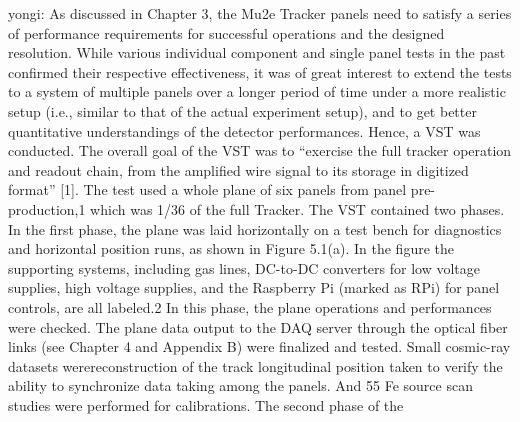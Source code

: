 yongi:
As discussed in Chapter 3, the Mu2e Tracker panels need to satisfy a series of performance
requirements for successful operations and the designed resolution. While various individual
component and single panel tests in the past confirmed their respective effectiveness, it was of great
interest to extend the tests to a system of multiple panels over a longer period of time under a more
realistic setup (i.e., similar to that of the actual experiment setup), and to get better quantitative
understandings of the detector performances. Hence, a VST was conducted.
The overall goal of the VST was to “exercise the full tracker operation and readout chain,
from the amplified wire signal to its storage in digitized format” [1]. The test used a whole plane of
six panels from panel pre-production,1 which was 1/36 of the full Tracker.
The VST contained two phases. In the first phase, the plane was laid horizontally on a
test bench for diagnostics and horizontal position runs, as shown in Figure 5.1(a). In the figure
the supporting systems, including gas lines, DC-to-DC converters for low voltage supplies, high
voltage supplies, and the Raspberry Pi (marked as RPi) for panel controls, are all labeled.2 In this
phase, the plane operations and performances were checked. The plane data output to the DAQ
server through the optical fiber links (see Chapter 4 and Appendix B) were finalized and tested.
Small cosmic-ray datasets werereconstruction of the track longitudinal position taken to verify the ability to synchronize data taking among the
panels. And 55 Fe source scan studies were performed for calibrations. The second phase of the




